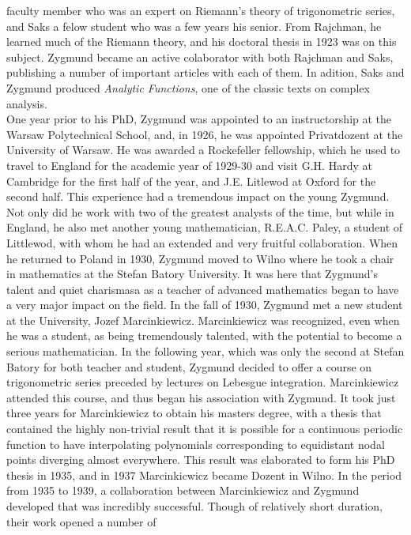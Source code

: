 faculty member who was an expert on Riemann's theory of trigonometric series, and Saks a felow student 
who was a few years his senior. From Rajchman, he learned much of the Riemann theory, and his doctoral thesis 
in 1923 was on this subject. Zygmund became an active colaborator with both Rajchman and Saks, publishing 
a number of important articles with each of them. In adition, Saks and Zygmund produced \textit{Analytic Functions}, 
one of the classic texts on complex analysis.\\
\indent One year prior to his PhD, Zygmund was appointed to an instructorship at the Warsaw Polytechnical 
School, and, in 1926, he was appointed Privatdozent at the University of Warsaw. He was awarded a Rockefeller fellowship, 
which he used to travel to England for the academic year of 1929-30 and visit G.H. Hardy at Cambridge 
for the first half of the year, and J.E. Litlewod at Oxford for the second half. This experience had a tremendous 
impact on the young Zygmund. Not only did he work with two of the greatest analysts of the time, but while in 
England, he also met another young mathematician, R.E.A.C. Paley, a student of Littlewod, with whom he had 
an extended and very fruitful collaboration. When he returned to Poland in 1930, Zygmund moved to Wilno where 
he took a chair in mathematics at the Stefan Batory University. It was here that Zygmund's talent and quiet charismasa 
as a teacher of advanced mathematics began to have a very major impact on the field. In the fall of 1930, 
Zygmund met a new student at the University, Jozef Marcinkiewicz. Marcinkiewicz was recognized, even when he 
was a student, as being tremendously talented, with the potential to become a serious mathematician. In the 
following year, which was only the second at Stefan Batory for both teacher and student, Zygmund decided to 
offer a course on trigonometric series preceded by lectures on Lebesgue integration. Marcinkiewicz attended 
this course, and thus began his association with Zygmund. It took just three years for Marcinkiewicz to obtain 
his masters degree, with a thesis that contained the highly non-trivial result that it is possible for 
a continuous periodic function to have interpolating polynomials corresponding to equidistant nodal points 
diverging almost everywhere. This result was elaborated to form his PhD thesis in 1935, and in 1937 Marcinkicwicz 
became Dozent in Wilno. In the period from 1935 to 1939, a collaboration between Marcinkiewicz and Zygmund 
developed that was incredibly successful. Though of relatively short duration, their work opened a number of 
